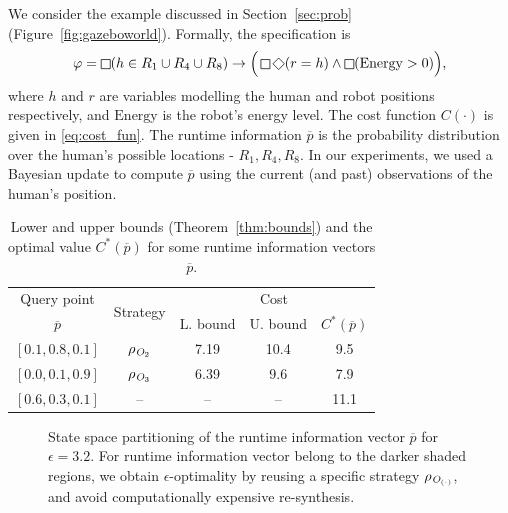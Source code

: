 We consider the example discussed in Section~\ref{sec:prob} (Figure~\ref{fig:gazeboworld}).
Formally, the specification is
\[
    \varphi = \LTLglobally (h \in R_1 \cup R_4 \cup R_8) \rightarrow \Big( \LTLglobally \LTLfinally (r = h) \wedge \LTLglobally (\mathrm{Energy} > 0) \Big),
\]
where $h$ and $r$ are variables modelling the human and robot positions respectively, and $\mathrm{Energy}$ is the robot's energy level.
The cost function $C(\cdot)$ is given in \eqref{eq:cost_fun}.
The runtime information $\overline{p}$ is the probability distribution over the human's possible locations - $R_1, R_4,R_8$. 
In our experiments, we used a Bayesian update to compute $\overline{p}$ using the current (and past) observations of the human's position. 

\begin{table}
    \centering
    \begin{tabular}{|c|c|c|c|c|}\toprule
        Query point  & \multirow{2}{*}{Strategy} & \multicolumn{3}{c|}{Cost}  \\\cmidrule{3-5}
        $\overline{p}$  & & L. bound & U. bound &  $C^\ast(\overline{p})$\\  \midrule
        $[0.1, 0.8, 0.1]$ & $\rho_{\textit{O}_2}$ & 7.19 & 10.4 & 9.5 \\ 
        $[0.0, 0.1, 0.9]$ & $\rho_{\textit{O}_3}$  & 6.39 & 9.6 & 7.9 \\ 
        \rowcolor{red!10} $[0.6, 0.3, 0.1]$ & -- & -- & -- & 11.1\\ \bottomrule
    \end{tabular}
    \caption{Lower and upper bounds (Theorem~\ref{thm:bounds}) and the optimal value $C^\ast(\overline{p})$ for some runtime information vectors $\overline{p}$.}
    \label{tab:perf}
\end{table}{}
\begin{figure}
    \centering
    
    \caption{State space partitioning of the runtime information vector $\overline{p}$ for $\epsilon = 3.2$. For runtime information vector belong to the darker shaded regions, we obtain $\epsilon$-optimality by reusing a specific strategy $\rho_{\textit{O}_{(\cdot)}}$, and avoid computationally expensive re-synthesis.}
    \label{fig:partition}
\end{figure}

 

